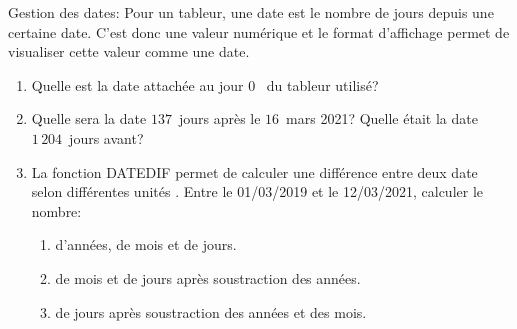 \documentclass[a4paper, 9pt]{article}
\newcommand*{\sff}[1] {{\sffamily#1}}
\begin{document}
\exost Gestion des dates:
  Pour un tableur, une date est le nombre de jours depuis une certaine date. C'est donc une valeur num\'erique et le format d'affichage permet de visualiser cette valeur comme une date.
  \begin{enumerate}
    \item Quelle est la date attach\'ee au \og jour $0$ \fg\ du tableur utilis\'e?
    \item Quelle sera la date $137$~jours après le $16$~mars 2021? Quelle \'etait la date $1\,204$~jours avant?
    \item La fonction \sff{DATEDIF} permet de calculer une diff\'erence entre deux date selon diff\'erentes \og unit\'es \fg. Entre le 01/03/2019 et le 12/03/2021, calculer le nombre:
    \begin{enumerate}
      \item d'ann\'ees, de mois et de jours.
      \item de mois et de jours après soustraction des ann\'ees.
      \item de jours après soustraction des ann\'ees et des mois.
    \end{enumerate}
  \end{enumerate}
\end{document}
